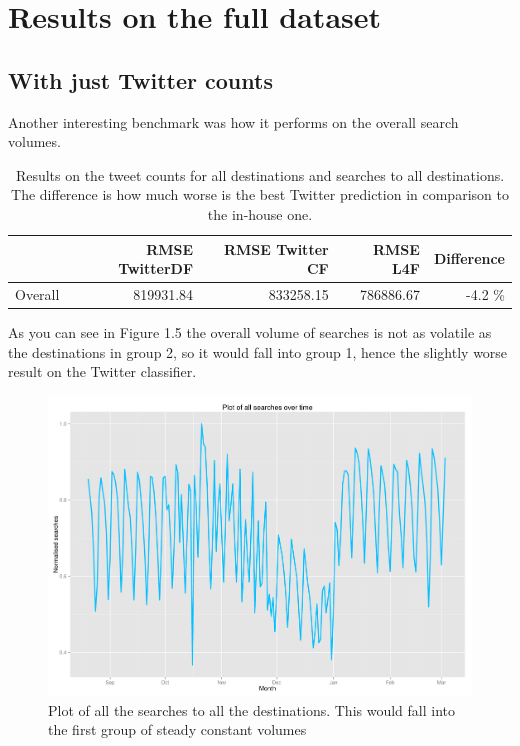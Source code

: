 \documentclass[minf,frontabs,twoside,singlespacing,parskip]{infthesis}
\begin{document}
\newpage
\section{Results on the full dataset}

\subsection{With just Twitter counts}

Another interesting benchmark was how it performs on the overall search volumes. 

\begin{table}[h]
\begin{center}
\begin{tabular}{ l | r | r | r | r}
 & RMSE TwitterDF & RMSE Twitter CF & RMSE L4F & Difference \\
\hline
Overall & 819931.84 & 833258.15  & 786886.67 & -4.2 \% \\
\end{tabular}
\end{center}
\caption{Results on the tweet counts for all destinations and searches to all destinations. The difference is how much worse is the best Twitter prediction in comparison to the in-house one. }
\end{table}

As you can see in Figure 1.5 the overall volume of searches is not as volatile as the destinations in group 2, so it would fall into group 1, hence the slightly worse result on the Twitter classifier.

\begin{figure}[h!]
\begin{center}
\includegraphics[scale=0.4]{overall}
\end{center}
\caption{Plot of all the searches to all the destinations. This would fall into the first group of steady constant volumes}
\end{figure}
\end{document}
